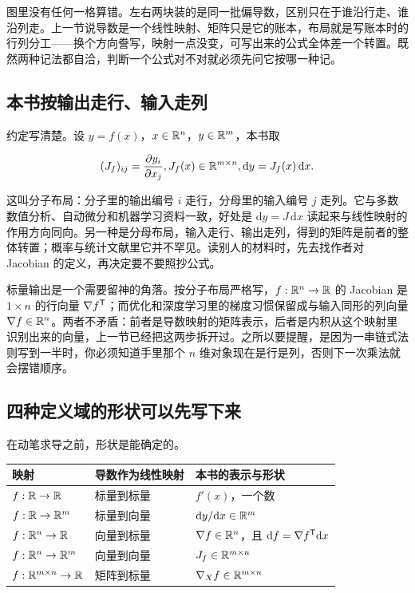 图里没有任何一格算错。左右两块装的是同一批偏导数，区别只在于谁沿行走、谁沿列走。上一节说导数是一个线性映射、矩阵只是它的账本，布局就是写账本时的行列分工——换个方向誊写，映射一点没变，可写出来的公式全体差一个转置。既然两种记法都自洽，判断一个公式对不对就必须先问它按哪一种记。

\subsection{本书按输出走行、输入走列}

约定写清楚。设 \(y=f(x)\)，\(x\in\mathbb{R}^n\)，\(y\in\mathbb{R}^m\)，本书取

\[
(J_f)_{ij}=\frac{\partial y_i}{\partial x_j},
\space
J_f(x)\in\mathbb{R}^{m\times n},
\space
\mathrm dy=J_f(x)\,\mathrm dx.
\]

这叫分子布局：分子里的输出编号 \(i\) 走行，分母里的输入编号 \(j\) 走列。它与多数数值分析、自动微分和机器学习资料一致，好处是 \(\mathrm dy=J\,\mathrm dx\) 读起来与线性映射的作用方向同向。另一种是分母布局，输入走行、输出走列，得到的矩阵是前者的整体转置；概率与统计文献里它并不罕见。读别人的材料时，先去找作者对 Jacobian 的定义，再决定要不要照抄公式。

标量输出是一个需要留神的角落。按分子布局严格写，\(f:\mathbb{R}^n\to\mathbb{R}\) 的 Jacobian 是 \(1\times n\) 的行向量 \(\nabla f^{\mathsf{T}}\)；而优化和深度学习里的梯度习惯保留成与输入同形的列向量 \(\nabla f\in\mathbb{R}^n\)。两者不矛盾：前者是导数映射的矩阵表示，后者是内积从这个映射里识别出来的向量，上一节已经把这两步拆开过。之所以要提醒，是因为一串链式法则写到一半时，你必须知道手里那个 \(n\) 维对象现在是行是列，否则下一次乘法就会摆错顺序。

\subsection{四种定义域的形状可以先写下来}

在动笔求导之前，形状是能确定的。

{\def\LTcaptype{none}
\begin{longtable}{@{}lll@{}}
\toprule\noalign{}
映射 & 导数作为线性映射 & 本书的表示与形状 \\
\midrule\noalign{}
\endhead
\bottomrule\noalign{}
\endlastfoot
\(f:\mathbb{R}\to\mathbb{R}\) & 标量到标量 & \(f'(x)\)，一个数 \\
\(f:\mathbb{R}\to\mathbb{R}^m\) & 标量到向量 & \(\mathrm dy/\mathrm dx\in\mathbb{R}^m\) \\
\(f:\mathbb{R}^n\to\mathbb{R}\) & 向量到标量 & \(\nabla f\in\mathbb{R}^n\)，且 \(\mathrm df=\nabla f^{\mathsf{T}}\mathrm dx\) \\
\(f:\mathbb{R}^n\to\mathbb{R}^m\) & 向量到向量 & \(J_f\in\mathbb{R}^{m\times n}\) \\
\(f:\mathbb{R}^{m\times n}\to\mathbb{R}\) & 矩阵到标量 & \(\nabla_X f\in\mathbb{R}^{m\times n}\) \\
\end{longtable}
}

